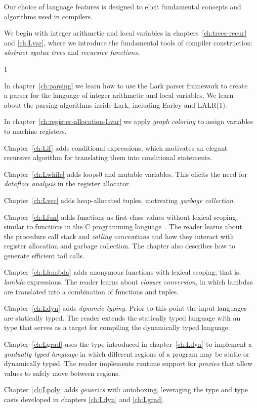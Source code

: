\documentclass[7x10]{TimesAPriori_MIT}%
\def\racketEd{0}
\def\pythonEd{1}
\providecommand{\BookEdition}{1}
\let\edition\BookEdition
\newcommand{\racket}[1]{{\if\edition\racketEd{#1}\fi}}
\newcommand{\pythonColor}[0]{}
\numberwithin{theorem}{chapter}
\numberwithin{definition}{chapter}
\numberwithin{equation}{chapter}
\begin{document}
Our choice of language features is designed to elicit fundamental
concepts and algorithms used in compilers.
\begin{itemize}
\item We begin with integer arithmetic and local variables in
  chapters~\ref{ch:trees-recur} and \ref{ch:Lvar}, where we introduce
  the fundamental tools of compiler construction: \emph{abstract
    syntax trees} and \emph{recursive functions}. 
{\if\edition\pythonEd\pythonColor
\item In chapter~\ref{ch:parsing} we learn how to use the Lark
  parser framework to create a parser for the language of integer
  arithmetic and local variables. We learn about the parsing
  algorithms inside Lark, including Earley and LALR(1).
%
\fi}
\item In chapter~\ref{ch:register-allocation-Lvar} we apply
  \emph{graph coloring} to assign variables to machine registers.
\item Chapter~\ref{ch:Lif} adds conditional expressions, which
  motivates an elegant recursive algorithm for translating them into
  conditional  statements.
\item Chapter~\ref{ch:Lwhile} adds loops\racket{ and mutable
  variables}. This elicits the need for \emph{dataflow
    analysis} in the register allocator.
\item Chapter~\ref{ch:Lvec} adds heap-allocated tuples, motivating
  \emph{garbage collection}.
\item Chapter~\ref{ch:Lfun} adds functions as first-class values 
  without lexical scoping, similar to functions in the C programming
  language~\citep{Kernighan:1988nx}. The reader learns about the
  procedure call stack and \emph{calling conventions} and how they interact
  with register allocation and garbage collection. The chapter also
  describes how to generate efficient tail calls.
\item Chapter~\ref{ch:Llambda} adds anonymous functions with lexical
  scoping, that is, \emph{lambda} expressions. The reader learns about
  \emph{closure conversion}, in which lambdas are translated into a
  combination of functions and tuples.
\item Chapter~\ref{ch:Ldyn} adds \emph{dynamic typing}. Prior to this
  point the input languages are statically typed.  The reader extends
  the statically typed language with an  type that serves
  as a target for compiling the dynamically typed language.
\item Chapter~\ref{ch:Lgrad} uses the  type introduced in
  chapter~\ref{ch:Ldyn} to implement a \emph{gradually typed language}
  in which different regions of a program may be static or dynamically
  typed. The reader implements runtime support for \emph{proxies} that
  allow values to safely move between regions.
\item Chapter~\ref{ch:Lpoly} adds \emph{generics} with autoboxing,
  leveraging the  type and type casts developed in chapters
  \ref{ch:Ldyn} and \ref{ch:Lgrad}.
\end{itemize}
\end{document}
